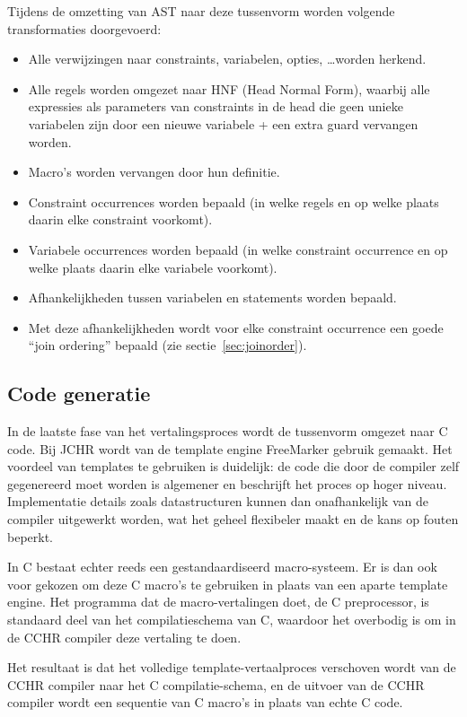 Tijdens de omzetting van AST naar deze tussenvorm worden volgende transformaties doorgevoerd: \begin{itemize}
\item Alle verwijzingen naar constraints, variabelen, opties, \ldots worden herkend.
\item Alle regels worden omgezet naar HNF (Head Normal Form), waarbij alle expressies als parameters van constraints in de head die geen unieke variabelen zijn door een nieuwe variabele + een extra guard vervangen worden.
\item Macro's worden vervangen door hun definitie.
\item Constraint occurrences worden bepaald (in welke regels en op welke plaats daarin elke constraint voorkomt).
\item Variabele occurrences worden bepaald (in welke constraint occurrence en op welke plaats daarin elke variabele voorkomt).
\item Afhankelijkheden tussen variabelen en statements worden bepaald.
\item Met deze afhankelijkheden wordt voor elke constraint occurrence een goede ``join ordering'' bepaald (zie sectie~\ref{sec:joinorder}).
\end{itemize}

\subsection{Code generatie} \label{sec:codegen}

In de laatste fase van het vertalingsproces wordt de tussenvorm omgezet naar C code. Bij JCHR wordt van de template engine FreeMarker gebruik gemaakt. Het voordeel van templates te gebruiken is duidelijk: de code die door de compiler zelf gegenereerd moet worden is algemener en beschrijft het proces op hoger niveau. Implementatie details zoals datastructuren kunnen dan onafhankelijk van de compiler uitgewerkt worden, wat het geheel flexibeler maakt en de kans op fouten beperkt.

In C bestaat echter reeds een gestandaardiseerd macro-systeem. Er is dan ook voor gekozen om deze C macro's te gebruiken in plaats van een aparte template engine. Het programma dat de macro-vertalingen doet, de C preprocessor, is standaard deel van het compilatieschema van C, waardoor het overbodig is om in de CCHR compiler deze vertaling te doen.

Het resultaat is dat het volledige template-vertaalproces verschoven wordt van de CCHR compiler naar het C compilatie-schema, en de uitvoer van de CCHR compiler wordt een sequentie van C macro's in plaats van echte C code.

